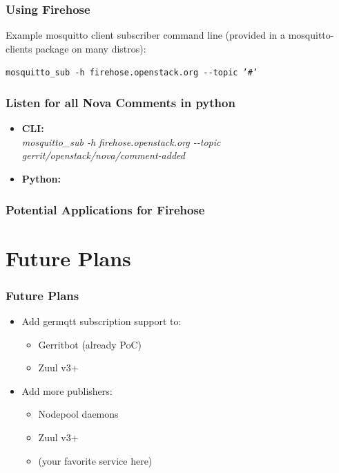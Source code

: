 \documentclass[aspectratio=169,11pt,hyperref={colorlinks=true}]{beamer}
\begin{document}
\begin{frame}
\begin{columns}[T]
\begin{column}{.48\textwidth}
        \end{column}
    \end{columns}
\end{frame}

\begin{frame}
    \frametitle{Using Firehose}
    Example mosquitto client subscriber command line (provided in a
mosquitto-clients package on many distros):

    \begin{center}
        \texttt{mosquitto\_sub \--h firehose.openstack.org \--\--topic '\#'}
    \end{center}
\end{frame}

\begin{frame}
    \frametitle{Listen for all Nova Comments in python}
    \begin{itemize}
        \item \textbf{CLI:}\\
            \textit{mosquitto\_sub \--h firehose.openstack.org \--\--topic gerrit/openstack/nova/comment-added}
        \item \textbf{Python:}\\
            
    \end{itemize}
\end{frame}


\begin{frame}
    \frametitle{Potential Applications for Firehose}
\end{frame}

\section{Future Plans}
\begin{frame}
    \frametitle{Future Plans}
    \begin{itemize}
        \item Add germqtt subscription support to:
            \begin{itemize}
                \item Gerritbot (already PoC)
                \item Zuul v3+
            \end{itemize}
        \item Add more publishers:
            \begin{itemize}
                \item Nodepool daemons
                \item Zuul v3+
                \item (your favorite service here)
            \end{itemize}
    \end{itemize}
\end{frame}
\end{document}

